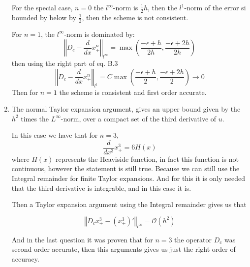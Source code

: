 \documentclass{article}
\numberwithin{equation}{section}
\begin{document}
\begin{enumerate}[label=(\alph*)]
        For the special case, $n = 0$ the $l^\infty$-norm is $\frac{1}{2}h$, then the $l^1$-norm of the error si bounded by below by $\frac{1}{2}$, then the scheme is not consistent.

        For $n = 1$,  the $l^\infty$-norm is dominated by:
            $$\left\Vert D_c - \frac{d}{dx}x_{+}^n \right\Vert_{l^\infty} = \max{\left(\frac{-\epsilon+h}{2h}, \frac{-\epsilon+2h}{2h}\right)}$$
        then using the right part of eq. B.3
            $$\left\Vert D_c - \frac{d}{dx}x_{+}^n \right\Vert_{l^1} = C\max{\left(\frac{-\epsilon+h}{2}, \frac{-\epsilon+2h}{2}\right)}\to 0$$
        Then for $n=1$ the scheme is consistent and first order accurate.

        \item The normal Taylor expansion argument, gives an upper bound given by the $h^2$ times the $L^\infty$-norm, over a compact set of the third derivative of $u$.
        
        In this case we have that for $n=3$,
            $$\frac{d}{dx^3}x_{+}^3 = 6H(x)$$
        where $H(x)$ represents the Heaviside function, in fact this function is not continuous, however the statement is still true. Because we can still use the Integral remainder for finite Taylor expansions. And for this it is only needed that the third derivative is integrable, and in this case it is.

        Then a Taylor expansion argument using the Integral remainder gives us that
        
        $$\left\Vert D_c x_{+}^3 - (x_{+}^3)' \right\Vert_{l^\infty} = \mathcal{O}(h^2)$$

        And in the last question it was proven that for $n =3$ the operator $D_c$ was second order accurate, then this arguments gives us just the right order of accuracy.
    \end{enumerate}
\end{document}
